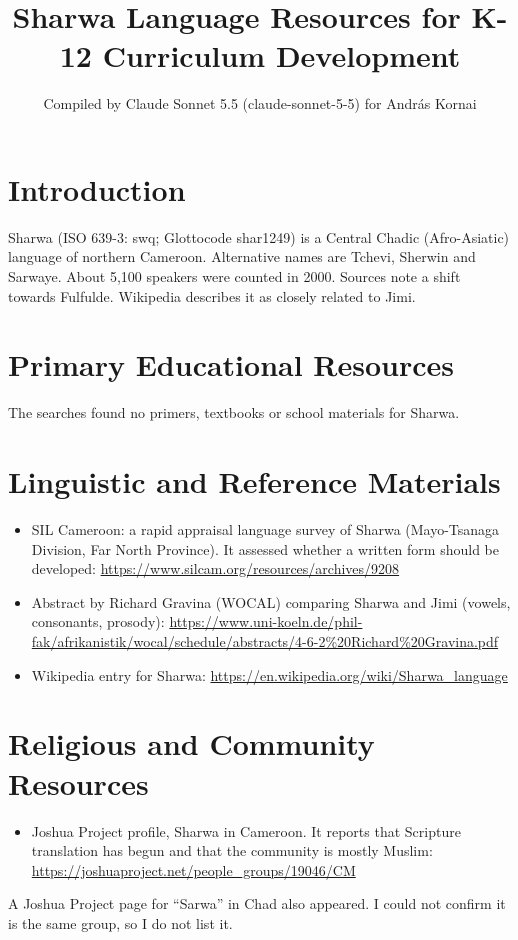 \documentclass[12pt]{article}
\title{Sharwa Language Resources for K-12 Curriculum Development}
\author{Compiled by Claude Sonnet 5.5 (claude-sonnet-5-5) for Andr\'as Kornai}
\date{}
\begin{document}
\maketitle

\section{Introduction}
Sharwa (ISO 639-3: swq; Glottocode shar1249) is a Central Chadic (Afro-Asiatic) language of northern Cameroon. Alternative names are Tchevi, Sherwin and Sarwaye. About 5,100 speakers were counted in 2000. Sources note a shift towards Fulfulde. Wikipedia describes it as closely related to Jimi.

\section{Primary Educational Resources}
The searches found no primers, textbooks or school materials for Sharwa.

\section{Linguistic and Reference Materials}
\begin{itemize}
\item SIL Cameroon: a rapid appraisal language survey of Sharwa (Mayo-Tsanaga Division, Far North Province). It assessed whether a written form should be developed: \url{https://www.silcam.org/resources/archives/9208}
\item Abstract by Richard Gravina (WOCAL) comparing Sharwa and Jimi (vowels, consonants, prosody): \url{https://www.uni-koeln.de/phil-fak/afrikanistik/wocal/schedule/abstracts/4-6-2%20Richard%20Gravina.pdf}
\item Wikipedia entry for Sharwa: \url{https://en.wikipedia.org/wiki/Sharwa_language}
\end{itemize}

\section{Religious and Community Resources}
\begin{itemize}
\item Joshua Project profile, Sharwa in Cameroon. It reports that Scripture translation has begun and that the community is mostly Muslim: \url{https://joshuaproject.net/people_groups/19046/CM}
\end{itemize}
A Joshua Project page for ``Sarwa'' in Chad also appeared. I could not confirm it is the same group, so I do not list it.
\end{document}
